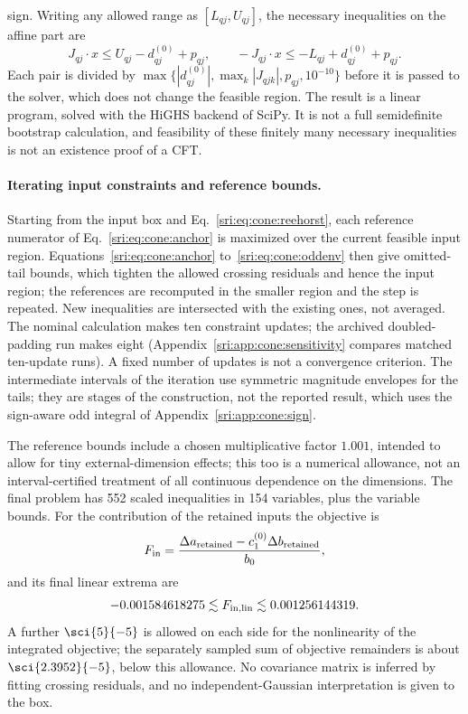 sign. Writing any allowed range as $[L_{qj},U_{qj}]$, the necessary inequalities on the affine part are
\begin{equation}
 J_{qj}\cdot x\le U_{qj}-d^{(0)}_{qj}+p_{qj},\qquad -J_{qj}\cdot x\le-L_{qj}+d^{(0)}_{qj}+p_{qj}.
 \label{sri:eq:cone:lp}
\end{equation}
Each pair is divided by $\max\{|d^{(0)}_{qj}|,\max_k|J_{qjk}|,p_{qj},10^{-10}\}$ before it is passed to the solver,
which does not change the feasible region. The result is a linear program, solved with the HiGHS backend of SciPy. It is
not a full semidefinite bootstrap calculation, and feasibility of these finitely many necessary inequalities is not an
existence proof of a CFT.

\paragraph{Iterating input constraints and reference bounds.} Starting from the input box and
Eq.~\eqref{sri:eq:cone:reehorst}, each reference numerator of Eq.~\eqref{sri:eq:cone:anchor} is maximized over the current
feasible input region. Equations~\eqref{sri:eq:cone:anchor} to~\eqref{sri:eq:cone:oddenv} then give omitted-tail bounds, which
tighten the allowed crossing residuals and hence the input region; the references are recomputed in the smaller region
and the step is repeated. New inequalities are intersected with the existing ones, not averaged. The nominal calculation
makes ten constraint updates; the archived doubled-padding run makes eight (Appendix~\ref{sri:app:cone:sensitivity} compares
matched ten-update runs). A fixed number of updates is not a convergence criterion. The intermediate intervals of the
iteration use symmetric magnitude envelopes for the tails; they are stages of the construction, not the reported result,
which uses the sign-aware odd integral of Appendix~\ref{sri:app:cone:sign}.

The reference bounds include a chosen multiplicative factor $1.001$, intended to allow for tiny external-dimension
effects; this too is a numerical allowance, not an interval-certified treatment of all continuous dependence on the
dimensions. The final problem has 552 scaled inequalities in 154 variables, plus the variable bounds. For the
contribution of the retained inputs the objective is
\begin{equation}
 F_{\rm in}=\frac{\Delta a_{\rm retained}-c_1^{(0)}\Delta b_{\rm retained}}{b_0},
\end{equation}
and its final linear extrema are
\begin{equation}
 -0.001584618275\lesssim F_{\rm in,lin}\lesssim0.001256144319 .
 \label{sri:eq:cone:inputlp}
\end{equation}
A further $\sci{5}{-5}$ is allowed on each side for the nonlinearity of the integrated objective; the separately
sampled sum of objective remainders is about $\sci{2.3952}{-5}$, below this allowance. No covariance matrix is
inferred by fitting crossing residuals, and no independent-Gaussian interpretation is given to the box.

